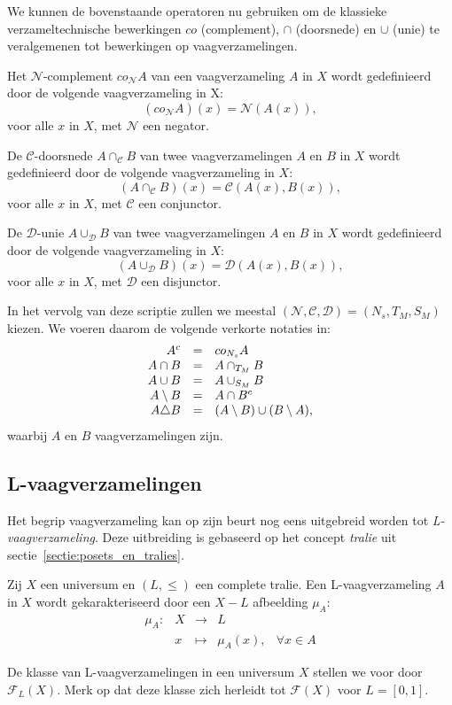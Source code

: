 We kunnen de bovenstaande operatoren nu gebruiken om de klassieke verzameltechnische bewerkingen 
$co$ (complement), $\cap$ (doorsnede) en $\cup$ (unie) te
veralgemenen tot bewerkingen op vaagverzamelingen.
\begin{definitie}
Het $\mathcal{N}$-complement $co_\mathcal{N} A$ van een vaagverzameling $A$ in $X$ wordt gedefinieerd
door de volgende vaagverzameling in X:
$$
(co_\mathcal{N} A)(x) = \mathcal{N}(A(x)),
$$
voor alle $x$ in $X$, met $\mathcal{N}$ een negator.
\end{definitie}
\begin{definitie}
De $\mathcal{C}$-doorsnede $A \cap_\mathcal{C} B$ van twee vaagverzamelingen $A$ en $B$ in $X$
wordt gedefinieerd door de volgende vaagverzameling in $X$:
$$
(A \cap_\mathcal{C} B)(x) = \mathcal{C}(A(x),B(x)),
$$
voor alle $x$ in $X$, met $\mathcal{C}$ een conjunctor.
\end{definitie}
\begin{definitie}
De $\mathcal{D}$-unie $A \cup_\mathcal{D} B$ van twee vaagverzamelingen $A$ en $B$ in $X$ wordt gedefinieerd door de
volgende vaagverzameling in $X$:
$$
(A \cup_\mathcal{D} B)(x) = \mathcal{D}(A(x),B(x)),
$$
voor alle $x$ in $X$, met $\mathcal{D}$ een disjunctor.
\end{definitie}

In het vervolg van deze scriptie zullen we meestal 
$(\mathcal{N},\mathcal{C},\mathcal{D})=(N_s,T_M,S_M)$ kiezen. We voeren daarom de volgende
verkorte notaties in:
$$
\begin{array}{r@{\quad=\quad}l}
A^c 			& co_{N_s} A \\
A \cap B 		& A \cap_{T_M} B \\
A \cup B		& A \cup_{S_M} B \\
A \setminus B  	& A \cap B^c \\
A \triangle B 	& (A \setminus B) \cup (B \setminus A),
\end{array}
$$
waarbij $A$ en $B$ vaagverzamelingen zijn.


\subsection{L-vaagverzamelingen}

Het begrip vaagverzameling kan op zijn beurt nog eens uitgebreid worden tot 
\emph{L-vaagverzameling}. Deze uitbreiding is gebaseerd op het concept \emph{tralie}
uit sectie~\ref{sectie:posets_en_tralies}.
\begin{definitie}
Zij $X$ een universum en $(L,\le)$ een complete tralie. Een L-vaagverzameling $A$ in $X$ wordt
gekarakteriseerd door een $X - L$ afbeelding $\mu_A$:
$$
\begin{array}{lllll}
\mu_A: 	& X & \to 		& L	& \\
		& x & \mapsto 	& \mu_A(x),		& \forall x \in A
\end{array}
$$
\end{definitie}
\noindent
De klasse van L-vaagverzamelingen in een universum $X$ stellen we voor door 
$\mathcal{F}_L(X)$. Merk op dat deze klasse zich herleidt tot $\mathcal{F}(X)$ voor $L = [0,1]$.

